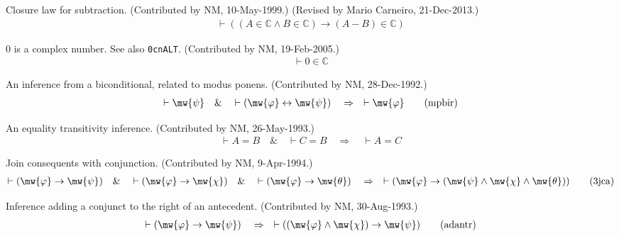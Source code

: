 \begin{lemma} Closure law for subtraction.  (Contributed by
NM, 10-May-1999.)
       (Revised by Mario Carneiro, 21-Dec-2013.)
\begin{align}
\vdash ( ( A \in \mathbb{C} \wedge B \in \mathbb{C} ) \rightarrow ( A \minus B
    ) \in \mathbb{C} )\label{eq:subcl}\tag{subcl}
\end{align}
\end{lemma}


\begin{lemma} 0 is a complex number.  See also {\tt 0cnALT}. 
(Contributed by NM,
     19-Feb-2005.)
\begin{align}
\vdash 0 \in \mathbb{C}\label{eq:0cn}\tag{0cn}
\end{align}
\end{lemma}


\begin{lemma} An inference from a biconditional, related to
modus ponens.
       (Contributed by NM, 28-Dec-1992.)
\begin{align}
\vdash \mw{\psi}\quad\&\quad \vdash ( \mw{\varphi} \leftrightarrow \mw{\psi}
    )\quad\Rightarrow\quad \vdash \mw{\varphi}\label{eq:mpbir}\tag{mpbir}
\end{align}
\end{lemma}


\begin{lemma} An equality transitivity inference. 
(Contributed by NM,
       26-May-1993.)
\begin{align}
\vdash A = B\quad\&\quad \vdash C = B\quad\Rightarrow\quad \vdash A =
    C\label{eq:eqtr4i}\tag{eqtr4i}
\end{align}
\end{lemma}


\begin{lemma} Join consequents with conjunction. 
(Contributed by NM, 9-Apr-1994.)
\begin{align}
\vdash ( \mw{\varphi} \rightarrow \mw{\psi} )\quad\&\quad \vdash ( \mw{\varphi}
    \rightarrow \mw{\chi} )\quad\&\quad \vdash ( \mw{\varphi} \rightarrow
    \mw{\theta} )\quad\Rightarrow\quad \vdash ( \mw{\varphi} \rightarrow (
    \mw{\psi} \wedge \mw{\chi} \wedge \mw{\theta} ) )\label{eq:3jca}\tag{3jca}
\end{align}
\end{lemma}


\begin{lemma} Inference adding a conjunct to the right of
an antecedent.  (Contributed
       by NM, 30-Aug-1993.)
\begin{align}
\vdash ( \mw{\varphi} \rightarrow \mw{\psi} )\quad\Rightarrow\quad \vdash ( (
    \mw{\varphi} \wedge \mw{\chi} ) \rightarrow \mw{\psi}
    )\label{eq:adantr}\tag{adantr}
\end{align}
\end{lemma}


